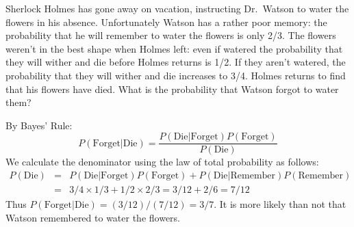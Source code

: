 \documentclass[addpoints,12pt]{exam}
\begin{document}
\begin{questions}


  \question[15] Sherlock Holmes has gone away on vacation, instructing Dr.\ Watson to water the flowers in his absence. 
  Unfortunately Watson has a rather poor memory: the probability that he will remember to water the flowers is only 2/3.
  The flowers weren't in the best shape when Holmes left: even if watered the probability that they will wither and die before Holmes returns is 1/2.
  If they aren't watered, the probability that they will wither and die increases to 3/4. 
  Holmes returns to find that his flowers have died.
  What is the probability that Watson forgot to water them?
  \begin{solution}[2.5in]
    By Bayes' Rule:
    \begin{equation*}
      P(\mbox{Forget}|\mbox{Die}) = \frac{P(\mbox{Die}|\mbox{Forget})P(\mbox{Forget})}{P(\mbox{Die})}
    \end{equation*}
    We calculate the denominator using the law of total probability as follows:
    \begin{eqnarray*}
      P(\mbox{Die}) &=& P(\mbox{Die}|\mbox{Forget})P(\mbox{Forget})+ P(\mbox{Die}|\mbox{Remember})P(\mbox{Remember})\\
      &=& 3/4 \times 1/3 + 1/2 \times 2/3 = 3/12 + 2/6 = 7/12
    \end{eqnarray*}
    Thus $P(\mbox{Forget}|\mbox{Die}) = (3/12)/(7/12) = 3/7$.
    It is more likely than not that Watson remembered to water the flowers.
  \end{solution}


\end{questions}
\end{document}
